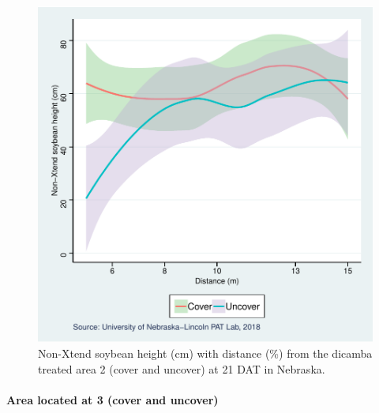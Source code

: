\documentclass[]{article}
\let\oldparagraph\paragraph
\renewcommand{\paragraph}[1]{\oldparagraph{#1}\mbox{}}
\begin{document}
\begin{figure}
\centering
\includegraphics{Report_Dicamba_study_files/figure-latex/unnamed-chunk-77-1.pdf}
\caption{Non-Xtend soybean height (cm) with distance (\%) from the
dicamba treated area 2 (cover and uncover) at 21 DAT in Nebraska.}
\end{figure}

\newpage

\pagebreak

\paragraph{Area located at 3 (cover and
uncover)}\label{area-located-at-3-cover-and-uncover}
\end{document}

